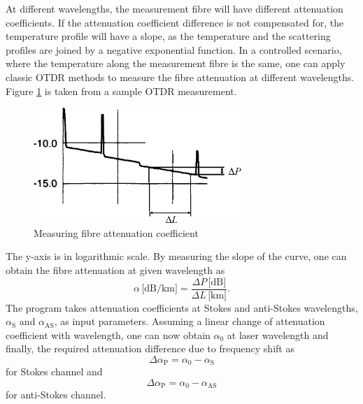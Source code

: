 \documentclass{standalone}
\begin{document}
At different wavelengths, the measurement fibre will have different attenuation coefficients. If the attenuation coefficient difference is not compensated for, the temperature profile will have a slope, as the temperature and the scattering profiles are joined by a negative exponential function. In a controlled scenario, where the temperature along the measurement fibre is the same, one can apply classic OTDR methods to measure the fibre attenuation at different wavelengths. Figure \ref{fig:otdr_attenuation} is taken from a sample OTDR measurement. 
\begin{figure}[h]
	\centering
	\includegraphics[width=0.7\textwidth]{otdr_attenuation.png}
	\caption{Measuring fibre attenuation coefficient}
	\label{fig:otdr_attenuation}
\end{figure}
The y-axis is in logarithmic scale. By measuring the slope of the curve, one can obtain the fibre attenuation at given wavelength as \cite{fer:oks}\cite{UnderstandingOTDRs2000}
\begin{equation}
\alpha \, \textrm{[dB/km]} = \dfrac{\varDelta P \, \textrm{[dB]}}{\varDelta L \, \textrm{[km]}} \textrm{.}
\end{equation}
The program takes attenuation coefficients at Stokes and anti-Stokes wavelengths, $\alpha_\textrm{S}$ and $\alpha_\textrm{AS}$, as input parameters. Assuming a linear change of attenuation coefficient with wavelength, one can now obtain $\alpha_0$ at laser wavelength and finally, the required attenuation difference due to frequency shift as
\begin{equation}
\varDelta \alpha_\textrm{P} = \alpha_0 - \alpha_\textrm{S}
\end{equation}
for Stokes channel and
\begin{equation}
\varDelta \alpha_\textrm{P} = \alpha_0 - \alpha_\textrm{AS}
\end{equation}
for anti-Stokes channel. \\
\end{document}
